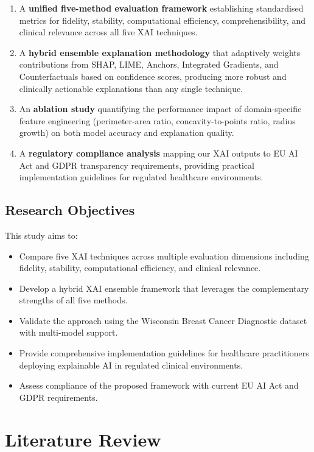 \documentclass[journal]{IEEEtran}
\begin{document}
\begin{enumerate}
\item A \textbf{unified five-method evaluation framework} establishing standardised metrics for fidelity, stability, computational efficiency, comprehensibility, and clinical relevance across all five XAI techniques.
\item A \textbf{hybrid ensemble explanation methodology} that adaptively weights contributions from SHAP, LIME, Anchors, Integrated Gradients, and Counterfactuals based on confidence scores, producing more robust and clinically actionable explanations than any single technique.
\item An \textbf{ablation study} quantifying the performance impact of domain-specific feature engineering (perimeter-area ratio, concavity-to-points ratio, radius growth) on both model accuracy and explanation quality.
\item A \textbf{regulatory compliance analysis} mapping our XAI outputs to EU AI Act and GDPR transparency requirements, providing practical implementation guidelines for regulated healthcare environments.
\end{enumerate}

\subsection{Research Objectives}

This study aims to:
\begin{itemize}
\item Compare five XAI techniques across multiple evaluation dimensions including fidelity, stability, computational efficiency, and clinical relevance.
\item Develop a hybrid XAI ensemble framework that leverages the complementary strengths of all five methods.
\item Validate the approach using the Wisconsin Breast Cancer Diagnostic dataset with multi-model support.
\item Provide comprehensive implementation guidelines for healthcare practitioners deploying explainable AI in regulated clinical environments.
\item Assess compliance of the proposed framework with current EU AI Act and GDPR requirements.
\end{itemize}

\section{Literature Review}
\end{document}
